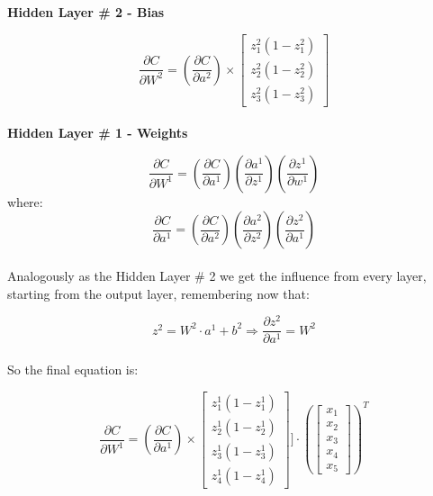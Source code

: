 \documentclass[12pt]{article}
\begin{document}
\textbf{Hidden Layer \# 2 - Bias}

\begin{equation}
\dfrac{\partial C}{\partial W^{2}} = \left(\dfrac{\partial C}{\partial a^{2}}\right)
\times
\begin{bmatrix}
z_{1}^{2} ( 1 - z_{1}^{2} )\\
z_{2}^{2} ( 1 - z_{2}^{2}) \\
z_{3}^{2} ( 1 - z_{3}^{2}) 
\end{bmatrix}
\end{equation} \mbox{} \\

\textbf{Hidden Layer \# 1 - Weights}

\begin{equation}
    \dfrac{\partial C}{\partial W^{1}} = \left(\dfrac{\partial C}{\partial a^{1}}\right)\left( \dfrac{\partial a^{1}}{\partial z^{1}}\right) \left( \dfrac{\partial z^{1}}{\partial w^{1}}\right)
\end{equation}
where:
\begin{equation}
     \dfrac{\partial C}{\partial a^{1}} = \left( \dfrac{\partial C}{\partial a^{2}}\right) \left( \dfrac{\partial a^{2}}{\partial z^{2}}\right) \left(\dfrac{\partial z^{2}}{\partial a^{1}} \right)
\end{equation} \mbox{} \\

Analogously as the Hidden Layer \# 2 we get the influence from every layer, starting from the output layer, remembering now that:

\[
z^{2} = W^{2}\cdot a^{1} + b^{2} \Rightarrow \dfrac{\partial z^{2}}{\partial a^{1}} = W^{2}
\] \mbox{} \\

So the final equation is:

\begin{equation}
\dfrac{\partial C}{\partial W^{1}} = \left(\dfrac{\partial C}{\partial a^{1}}\right)
\times
\begin{bmatrix}
z_{1}^{1} ( 1 - z_{1}^{1} )\\
z_{2}^{1} ( 1 - z_{2}^{1}) \\
z_{3}^{1} ( 1 - z_{3}^{1}) \\
z_{4}^{1} ( 1 - z_{4}^{1}) 
\end{bmatrix}
\Bigg]
\cdot
\left(
\begin{bmatrix}
x_{1}\\
x_{2}\\
x_{3}\\
x_{4}\\
x_{5}
\end{bmatrix}
\right)^{T}
\end{equation} \mbox{} \\
\end{document}
